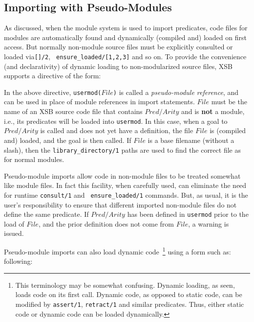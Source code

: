 \subsection{Importing with Pseudo-Modules}

As discussed, when the module system is used to import predicates,
code files for modules are automatically found and dynamically
(compiled and) loaded on first access.  But normally non-module source
files must be explicitly consulted or loaded via{\tt []/2}, {\tt
  ensure\_loaded/[1,2,3]} and so on.  To provide the convenience (and
declarativity) of dynamic loading to non-modularized source files, XSB
supports a directive of the form:


\noindent 
In the above directive, {\tt usermod($File$)} is called a {\em
  pseudo-module reference}, and can be used in place of module
references in import statements.  $File$ must be the name of an XSB
source code file that contains $Pred/Arity$ and is {\bf not} a module,
i.e., its predicates will be loaded into {\tt usermod}.  In this case,
when a goal to $Pred/Arity$ is called and does not yet have a
definition, the file $File$ is (compiled and) loaded, and the goal is
then called.  If $File$ is a base filename (without a slash), then the
{\tt library\_directory/1} paths are used to find the correct file as
for normal modules.


Pseudo-module imports allow code in non-module files to be treated
somewhat like module files.  In fact this facility, when carefully
used, can eliminate the need for runtime {\tt consult/1} and {\tt
  ensure\_loaded/1} commands.  But, as usual, it is the user's
responsibility to ensure that different imported non-module files do
not define the same predicate.  If $Pred/Arity$ has been defined in
{\tt usermod} prior to the load of $File$, and the prior definition
does not come from $File$, a warning is issued.

Pseudo-module imports can also load dynamic code~\footnote{This
  terminology may be somewhat confusing.  Dynamic loading, as seen,
  loads code on its first call.  Dynamic code, as opposed to static
  code, can be modified by {\tt assert/1}, {\tt retract/1} and similar
  predicates.  Thus, either static code or dynamic code can be loaded
  dynamically.}  using a form such as: following:

